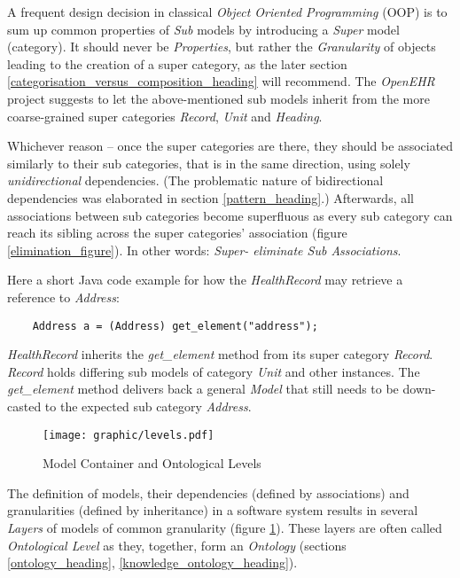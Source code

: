 A frequent design decision in classical \emph{Object Oriented Programming}
(OOP) is to sum up common properties of \emph{Sub} models by introducing a
\emph{Super} model (category). It should never be \emph{Properties}, but rather
the \emph{Granularity} of objects leading to the creation of a super category,
as the later section \ref{categorisation_versus_composition_heading} will
recommend. The \emph{OpenEHR} project \cite{openehr} suggests to let the
above-mentioned sub models inherit from the more coarse-grained super
categories \emph{Record}, \emph{Unit} and \emph{Heading}.

Whichever reason -- once the super categories are there, they should be
associated similarly to their sub categories, that is in the same direction,
using solely \emph{unidirectional} dependencies. (The problematic nature of
bidirectional dependencies was elaborated in section \ref{pattern_heading}.)
Afterwards, all associations between sub categories become superfluous as every
sub category can reach its sibling across the super categories' association
(figure \ref{elimination_figure}). In other words:
\emph{Super- eliminate Sub Associations}.

Here a short Java code example for how the \emph{HealthRecord} may retrieve a
reference to \emph{Address}:

\begin{scriptsize}
    \begin{verbatim}
    Address a = (Address) get_element("address");
    \end{verbatim}
\end{scriptsize}

\emph{HealthRecord} inherits the \emph{get\_element} method from its super
category \emph{Record}. \emph{Record} holds differing sub models of category
\emph{Unit} and other instances. The \emph{get\_element} method delivers back
a general \emph{Model} that still needs to be down-casted to the expected sub
category \emph{Address}.

\begin{figure}[ht]
    \begin{center}
        \texttt{[image: graphic/levels.pdf]}
        \caption{Model Container and Ontological Levels}
        \label{levels_figure}
    \end{center}
\end{figure}

The definition of models, their dependencies (defined by associations) and
granularities (defined by inheritance) in a software system results in several
\emph{Layers} of models of common granularity (figure \ref{levels_figure}).
These layers are often called \emph{Ontological Level} as they, together, form
an \emph{Ontology} (sections \ref{ontology_heading},
\ref{knowledge_ontology_heading}).

